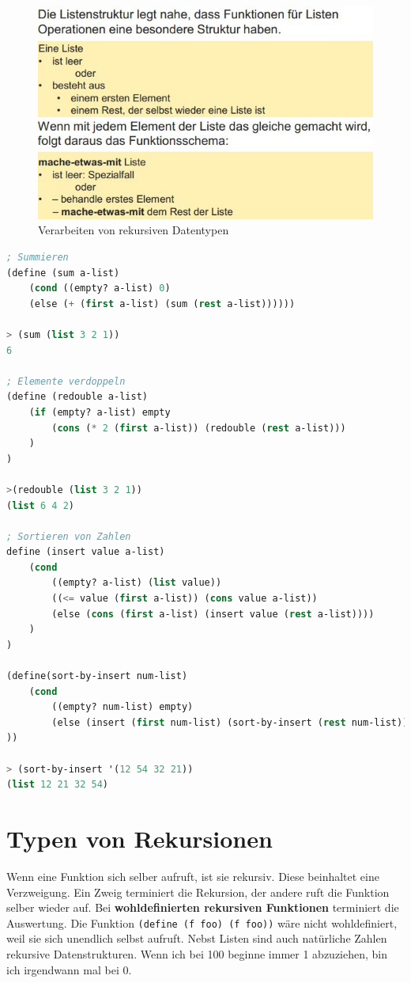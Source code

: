\begin{figure}[h!]
\centering
\includegraphics[width=0.7\linewidth]{fig/scheme-recursive-function-schema}
\caption{Verarbeiten von rekursiven Datentypen}
\label{fig:scheme-recursive-function-schema}
\end{figure}

\begin{lstlisting}[language=Lisp, caption=Funktionen auf listen]
; Summieren
(define (sum a-list)
	(cond ((empty? a-list) 0)
	(else (+ (first a-list) (sum (rest a-list))))))
	
> (sum (list 3 2 1))
6

; Elemente verdoppeln
(define (redouble a-list)
	(if (empty? a-list) empty
		(cons (* 2 (first a-list)) (redouble (rest a-list)))
	)
)

>(redouble (list 3 2 1))
(list 6 4 2)

; Sortieren von Zahlen
define (insert value a-list)
	(cond 
		((empty? a-list) (list value))
		((<= value (first a-list)) (cons value a-list))
		(else (cons (first a-list) (insert value (rest a-list))))
	)
)

(define(sort-by-insert num-list)
	(cond
		((empty? num-list) empty)
		(else (insert (first num-list) (sort-by-insert (rest num-list))))
))

> (sort-by-insert '(12 54 32 21))
(list 12 21 32 54)
\end{lstlisting}

\section{Typen von Rekursionen}
Wenn eine Funktion sich selber aufruft, ist sie rekursiv. Diese beinhaltet eine Verzweigung. Ein Zweig terminiert die Rekursion, der andere ruft die Funktion selber wieder auf. Bei \textbf{wohldefinierten rekursiven Funktionen} terminiert die Auswertung. Die Funktion \verb|(define (f foo) (f foo))| wäre nicht wohldefiniert, weil sie sich unendlich selbst aufruft. Nebst Listen sind auch natürliche Zahlen rekursive Datenstrukturen. Wenn ich bei 100 beginne immer 1 abzuziehen, bin ich irgendwann mal bei 0.

